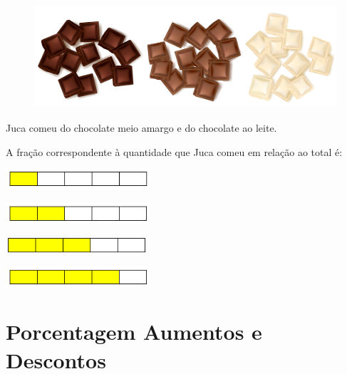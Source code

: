\begin{escolha}
\begin{figure}
\centering
\includegraphics[width=4.54097in,height=1.51544in]{./_SAEB_9_MAT/media/image53.png}
\end{figure}


Juca comeu  do chocolate meio amargo e  do
chocolate ao leite.

A fração correspondente à quantidade que Juca comeu em relação ao total é:

\begin{escolha}

\item
  \includegraphics[width=2.11685in,height=0.29169in]{./_SAEB_9_MAT/media/image54.png}
\item
  \includegraphics[width=2.10852in,height=0.30003in]{./_SAEB_9_MAT/media/image55.png}
\item
  \includegraphics[width=2.08351in,height=0.25002in]{./_SAEB_9_MAT/media/image56.png}
\item
  \includegraphics[width=2.10852in,height=0.30003in]{./_SAEB_9_MAT/media/image57.png}
\end{escolha}

\chapter{Porcentagem Aumentos e Descontos}


\end{escolha}

